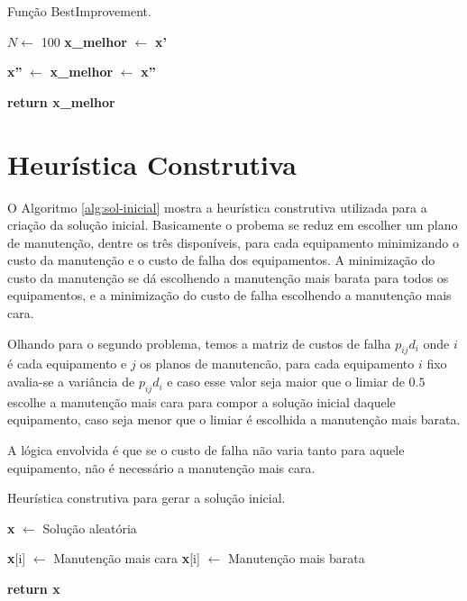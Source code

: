 \documentclass[
	12pt,				%
	oneside,			%
	a4paper,			%
	chapter=TITLE,
	sumario=tradicional,
	english,			%
	brazil				%
]{abntex2}
\begin{document}
\begin{algorithm}[H]
	\caption{Função BestImprovement.}\label{alg:best-improvement}

	\begin{algorithmic}[1]

	\State $N\gets$ 100 
	\State \textbf{x\_melhor} $\gets$ \textbf{x'}

		\State \textbf{x''} $\gets$  
			\State \textbf{x\_melhor} $\gets$ \textbf{x''}
		\EndIf
	\EndFor
		
	\Statex
	\State \textbf{return x\_melhor} 
	\EndProcedure 
	\end{algorithmic}
\end{algorithm}

\section{Heurística Construtiva}

O Algoritmo \ref{alg:sol-inicial} mostra a heurística construtiva utilizada para a criação da solução inicial. Basicamente o probema se reduz
em escolher um plano de manutenção, dentre os três disponíveis, para cada equipamento minimizando o custo da manutenção e o custo de falha dos equipamentos.
A minimização do custo da manutenção se dá escolhendo a manutenção mais barata para todos os equipamentos, e a minimização do custo de falha escolhendo a manutenção mais cara.

Olhando para o segundo problema, temos a matriz de custos de falha $p_{ij}d_{i}$ onde $i$ é cada equipamento e $j$ os planos de manutencão, para cada equipamento $i$ fixo avalia-se a
variância de $p_{ij}d_{i}$ e caso esse valor seja maior que o limiar de $0.5$ escolhe a manutenção mais cara para compor a solução inicial daquele equipamento,
caso seja menor que o limiar é escolhida a manutenção mais barata. 

A lógica envolvida é que se o custo de falha não varia tanto para aquele equipamento,
não é necessário a manutenção mais cara.

\begin{algorithm}[H]
	\caption{Heurística construtiva para gerar a solução inicial.}\label{alg:sol-inicial}
	\begin{algorithmic}[1]

	\State \textbf{x} $\gets$ Solução aleatória

			\State \textbf{x}[i] $\gets$ Manutenção mais cara
		\Else
			\State \textbf{x}[i] $\gets$ Manutenção mais barata
		\EndIf
	\EndFor
	   
	\Statex
	\State \textbf{return x} 
	\EndProcedure 
	\end{algorithmic}
\end{algorithm}
\end{document}
